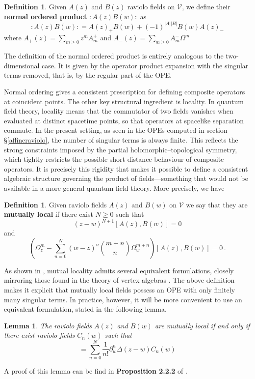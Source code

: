 \documentclass[11pt]{amsart}
\numberwithin{equation}{section}
\numberwithin{figure}{section}
\numberwithin{table}{section}
\theoremstyle{thm}
\newtheorem{lemma}[theorem]{Lemma}
\numberwithin{equation}{subsection}
\theoremstyle{definition}
\newtheorem{dfn}[theorem]{Definition}
\theoremstyle{rem}
\begin{document}
\begin{dfn}
    Given $A(z)$ and $B(z)$ raviolo fields on $\mathcal{V}$, we define their \textbf{normal ordered product} $:A(z)B(w):$ as
    \begin{equation}
        :A(z)B(w): = A(z)_+B(w)+(-1)^{|A||B|}B(w)A(z)_-
    \end{equation}
where $A_+(z)=\sum_{m\geq 0}z^m A^+_m $ and $A_-(z) = \sum_{m\geq 0}A^-_m\Omega^m$    
\end{dfn}

The definition of the normal ordered product is entirely analogous to the two-dimensional case. It is given by the operator product expansion with the singular terms removed, that is, by the regular part of the OPE. 


Normal ordering gives a consistent prescription for defining composite operators at coincident points. The other key structural ingredient is locality. In quantum field theory, locality means that the commutator of two fields vanishes when evaluated at distinct spacetime points, so that operators at spacelike separation commute. In the present setting, as seen in the OPEs computed in section \S \ref{affineraviolo}, the number of singular terms is always finite. This reflects the strong constraints imposed by the partial holomorphic–topological symmetry, which tightly restricts the possible short-distance behaviour of composite operators. It is precisely this rigidity that makes it possible to define a consistent algebraic structure governing the product of fields—something that would not be available in a more general quantum field theory. More precisely, we have


\begin{dfn}
    Given raviolo fields $A(z)$ and $B(w)$ on $\mathcal{V}$ we say that they are \textbf{mutually local} if there exist $N\geq 0$ such that 
    \begin{equation}
        (z-w)^{N+1}[A(z),B(w)]=0
    \end{equation}
    and 
    \begin{equation}
        \left(\Omega_z^m -\sum_{n=0}^N(w-z)^n\binom{m+n}{n}\Omega_w^{m+n}\right)[A(z),B(w)]=0 \,.
    \end{equation}
\end{dfn}
As shown in \cite{Garner:2023zqn}, mutual locality admits several equivalent formulations, closely mirroring those found in the theory of vertex algebras \cite{Kac1998,frenkel2004vertex}. The above definition makes it explicit that mutually local fields possess an OPE with only finitely many singular terms. In practice, however, it will be more convenient to use an equivalent formulation, stated in the following lemma.
\begin{lemma}
\label{ec:equivmutualloc}
    The raviolo fields $A(z)$ and $B(w)$ are mutually local if and only if there exist raviolo fields $C_n(w)$ such that 
    \begin{equation}
        [A(z),B(w)]=\sum_{n=0}^N \frac{1}{n!}\partial_w^n\Delta(z-w)C_n(w)
    \end{equation}
\end{lemma}
A proof of this lemma can be find in \textbf{Proposition 2.2.2} of \cite{Garner:2023zqn}. 
\end{document}

